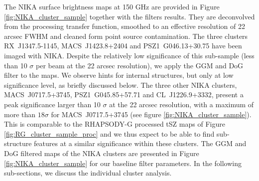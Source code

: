 \documentclass[twocolumn,traditabstract]{aa}
\begin{document}
The NIKA surface brightness maps at 150 GHz are provided in Figure \ref{fig:NIKA_cluster_sample} together with the filters results. They are deconvolved from the processing transfer function, smoothed to an effective resolution of 22 arcsec FWHM and cleaned form point source contamination. The three clusters \mbox{RX~J1347.5-1145}, \mbox{MACS~J1423.8+2404} and \mbox{PSZ1~G046.13+30.75} have been imaged with NIKA. Despite the relatively low significance of this sub-sample (less than 10 $\sigma$ per beam at the 22 arcsec resolution), we apply the GGM and DoG filter to the maps. We observe hints for internal structures, but only at low significance level, as briefly discussed below. The three other NIKA clusters, \mbox{MACS~J0717.5+3745}, \mbox{PSZ1~G045.85+57.71} and \mbox{CL~J1226.9+3332}, present a peak significance larger than 10 $\sigma$ at the 22 arcsec resolution, with a maximum of more than $18 \sigma$ for \mbox{MACS~J0717.5+3745} (see figure \ref{fig:NIKA_cluster_sample}). This is comparable to the RHAPSODY-G processed tSZ maps of Figure \ref{fig:RG_cluster_sample_proc} and we thus expect to be able to find sub-structure features at a similar significance within these clusters. The GGM and DoG filtered maps of the NIKA clusters are presented in Figure \ref{fig:NIKA_cluster_sample} for our baseline filter parameters. In the following sub-sections, we discuss the individual cluster analysis.

\end{document}
